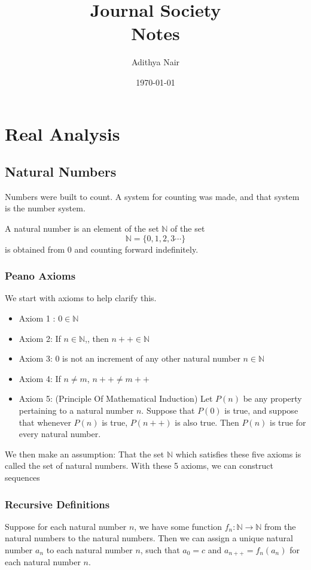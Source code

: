 \documentclass[11pt]{report}
\author{Adithya Nair}
\date{\today}
\title{\Huge{Journal Society\\ Notes}}
\begin{document}
\maketitle
\tableofcontents

\part{Real Analysis}

\chapter{Natural Numbers}
Numbers were built to count. A system for counting was made, and that system is the number system.
\begin{definition}
	A natural number is an element of the set $\mathbb{N}$ of the set
	\[
		\mathbb{N} = \{0,1,2,3\cdots \}
	\]
	is obtained from 0 and counting forward indefinitely.
\end{definition}
\section{Peano Axioms}

We start with axioms to help clarify this.
\begin{itemize}
	\item Axiom 1 : \(0 \in \mathbb{N}\)
	\item Axiom 2: If \(n \in \mathbb{N}\),, then \(n++ \in \mathbb{N}\)
	\item Axiom 3: 0 is not an increment of any other natural number \(n \in \mathbb{N}\)
	\item Axiom 4: If \(n \neq m\), \(n++ \neq m++\)
	\item Axiom 5: (Principle Of Mathematical Induction) Let \(P(n)\) be any property pertaining to a natural number \(n\). Suppose that \(P(0)\) is true, and suppose that whenever \(P(n)\) is true, \(P(n++)\) is also true. Then \(P(n)\) is true for every natural number.
\end{itemize}

We then make an assumption: That the set \(\mathbb{N}\) which satisfies these five axioms is called the set of natural numbers.
With these 5 axioms, we can construct sequences
\section{Recursive Definitions}

\begin{prop}
	Suppose for each natural number $n$, we have some function $f_n:\mathbb{N} \rightarrow \mathbb{N}$ from the natural numbers to the natural numbers. Then we can assign a unique natural number $a_n$ to each natural number $n$, such that $a_0 = c$ and $a_{n++} = f_n(a_n)$ for each natural number $n$.
\end{prop}
\end{document}
